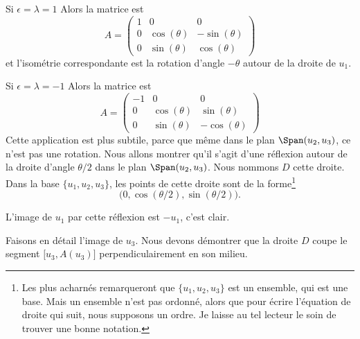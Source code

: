 \begin{subproof}
    \item[Si \( \epsilon=\lambda=1\)] Alors la matrice est
    \begin{equation}
        A=\begin{pmatrix}
            1    &   0    &   0    \\
            0    &   \cos(\theta)    &   -\sin(\theta)    \\
            0    &   \sin(\theta)    &   \cos(\theta)
        \end{pmatrix}
    \end{equation}
    et l'isométrie correspondante est la rotation d'angle \( -\theta\) autour de la droite de \( u_1\).

    \item[Si \( \epsilon=\lambda=-1\)]
    Alors la matrice est
    \begin{equation}
        A=\begin{pmatrix}
            -1    &  0     &   0    \\
            0    &   \cos(\theta)    &   \sin(\theta)    \\
            0    &   \sin(\theta)    &   -\cos(\theta)
        \end{pmatrix}
    \end{equation}
    Cette application est plus subtile, parce que même dans le plan \( \Span(u_2,u_3)\), ce n'est pas une rotation. Nous allons montrer qu'il s'agit d'une réflexion autour de la droite d'angle \( \theta/2\) dans le plan \( \Span(u_2,u_3)\). Nous nommons \( D\) cette droite. Dans la base \( \{ u_1,u_2,u_3 \}\), les points de cette droite sont de la forme\footnote{Les plus acharnés remarqueront que \( \{ u_1,u_2,u_3 \}\) est un ensemble, qui est une base. Mais un ensemble n'est pas ordonné, alors que pour écrire l'équation de droite qui suit, nous supposons un ordre. Je laisse au tel lecteur le soin de trouver une bonne notation.}
    \begin{equation}
        \big( 0,\cos(\theta/2),\sin(\theta/2) \big).
    \end{equation}

    L'image de \( u_1\) par cette réflexion est \(-u_1\), c'est clair.

    Faisons en détail l'image de \( u_3\). Nous devons démontrer que la droite \( D\) coupe le segment \( \mathopen[ u_3 , A(u_3) \mathclose]\) perpendiculairement en son milieu.


\end{subproof}
